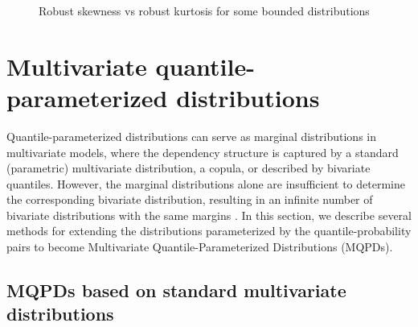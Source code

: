 \documentclass[
  fleqn,
  deca,
  blindrev
]{informs4}
\begin{document}
\begin{figure}


\caption{\label{fig-bounded}Robust skewness vs robust kurtosis for some
bounded distributions}

\end{figure}%

\section{Multivariate quantile-parameterized
distributions}\label{sec-multivariateqpd}

Quantile-parameterized distributions can serve as marginal distributions
in multivariate models, where the dependency structure is captured by a
standard (parametric) multivariate distribution, a copula, or described
by bivariate quantiles. However, the marginal distributions alone are
insufficient to determine the corresponding bivariate distribution,
resulting in an infinite number of bivariate distributions with the same
margins
\citep{gumbel1960BivariateExponentialDistributions, gumbel1961BivariateLogisticDistributions}.
In this section, we describe several methods for extending the
distributions parameterized by the quantile-probability pairs to become
Multivariate Quantile-Parameterized Distributions (MQPDs).

\subsection{MQPDs based on standard multivariate
distributions}\label{mqpds-based-on-standard-multivariate-distributions}
\end{document}
